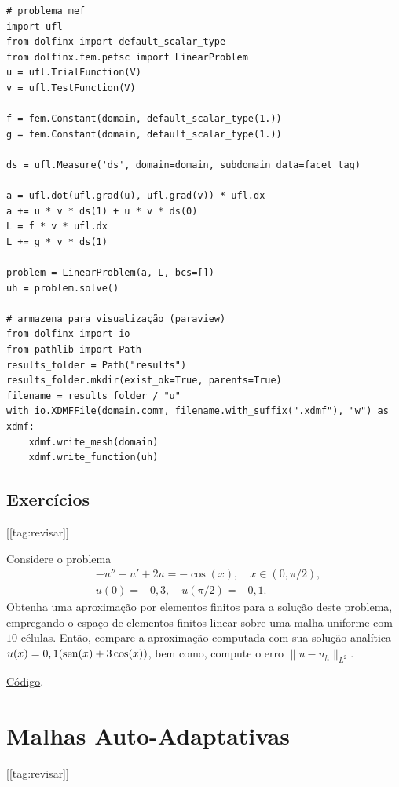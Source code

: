 \begin{ex}
\begin{lstlisting}
# problema mef
import ufl
from dolfinx import default_scalar_type
from dolfinx.fem.petsc import LinearProblem
u = ufl.TrialFunction(V)
v = ufl.TestFunction(V)

f = fem.Constant(domain, default_scalar_type(1.))
g = fem.Constant(domain, default_scalar_type(1.))

ds = ufl.Measure('ds', domain=domain, subdomain_data=facet_tag)

a = ufl.dot(ufl.grad(u), ufl.grad(v)) * ufl.dx
a += u * v * ds(1) + u * v * ds(0)
L = f * v * ufl.dx
L += g * v * ds(1)

problem = LinearProblem(a, L, bcs=[])
uh = problem.solve()

# armazena para visualização (paraview)
from dolfinx import io
from pathlib import Path
results_folder = Path("results")
results_folder.mkdir(exist_ok=True, parents=True)
filename = results_folder / "u"
with io.XDMFFile(domain.comm, filename.with_suffix(".xdmf"), "w") as xdmf:
    xdmf.write_mesh(domain)
    xdmf.write_function(uh)  
\end{lstlisting}

\end{ex}

\subsection{Exercícios}
[[tag:revisar]]

\begin{exer}\label{exer:dcr}
  Considere o problema
  \begin{align}
    &-u'' + u' + 2u = -\cos(x),\quad x\in (0, \pi/2),\\
    &u(0)=-0,3,\quad u(\pi/2)=-0,1.
  \end{align}
  Obtenha uma aproximação por elementos finitos para a solução deste problema, empregando o espaço de elementos finitos linear sobre uma malha uniforme com $10$ células. Então, compare a aproximação computada com sua solução analítica $u(x) = 0,1(\operatorname{sen}(x)+3\cos(x))$, bem como, compute o erro $\|u-u_h\|_{L^2}$.
\end{exer}
\begin{resp}
  \ifispython
  \href{https://github.com/phkonzen/notas/blob/master/src/MetodoElementosFinitos/cap_mef1d/dados/exer_dcr/exer_dcr.py}{Código}.
  \fi
\end{resp}

\section{Malhas Auto-Adaptativas}\label{cap_mef1d_sec_adapt}
[[tag:revisar]]


